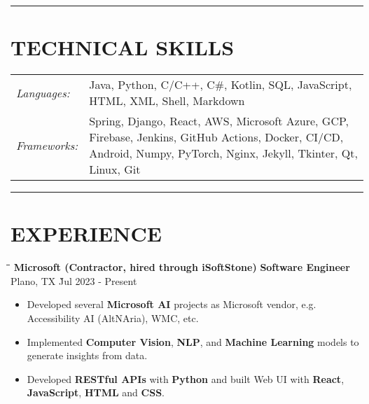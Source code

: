 \documentclass{res}
\begin{document}
\begin{resume}
\vspace{-8pt}
\hspace{-0.55in}
\noindent\rule[0.25\baselineskip]{19.36cm}{0.5pt}    
      
\vspace{-0.2in}
\section{TECHNICAL SKILLS}  
    \vspace{+0.1in}
    \hspace{-0.12in} 
    \begin{tabular}{l p{5.5in}}
    \rule{0in}{0.2in}
    {\sl Languages:} & Java, Python, C/C++, C\#, Kotlin, SQL, JavaScript, HTML, XML,  
                        Shell, Markdown \\ 
    \rule{0in}{0.2in}
    {\sl Frameworks:} & Spring, Django, React, AWS, Microsoft Azure, GCP, Firebase, Jenkins, GitHub Actions, Docker, CI/CD,
                        Android, Numpy, PyTorch, Nginx, Jekyll, Tkinter, Qt, Linux, Git
    \end{tabular}   

\vspace{-2pt}
\hspace{-0.55in}
\noindent\rule[0.25\baselineskip]{19.36cm}{0.5pt}    

\vspace{-0.2in}
\section{EXPERIENCE}
    \vspace{0.00in}	
    \begin{tabbing}
    \hspace{3.66in}\= \hspace{1.5in}\= \hspace{1.6in}\= \kill %
    {\bf Microsoft (Contractor, hired through iSoftStone)} \> {\bf Software Engineer}  \>  
                                    Plano, TX    \` Jul 2023 - Present\\
    \end{tabbing}\vspace{-20pt}      %
    \vspace{+0.1in}
    \begin{itemize} \itemsep 1.5pt %
    \item Developed several {\bf Microsoft AI} projects as Microsoft vendor, e.g. Accessibility AI (AltNAria), WMC, etc.
    \item Implemented {\bf Computer Vision}, {\bf NLP}, and {\bf Machine Learning} models to generate insights from data.
    \item Developed {\bf RESTful APIs} with {\bf Python} and built Web UI with {\bf React}, {\bf JavaScript}, {\bf HTML} and {\bf CSS}.
    

\end{itemize}
\end{resume}
\end{document}
